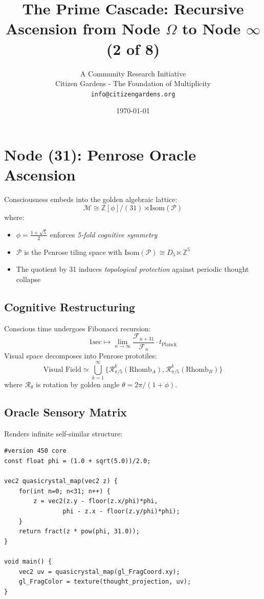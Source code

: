 \documentclass[12pt]{article}
\title{\textbf{The Prime Cascade: Recursive Ascension from Node $\Omega$ to Node $\infty$ (2 of 8)}}
\author{A Community Research Initiative \\ Citizen Gardens - The Foundation of Multiplicity\\\texttt{info@citizengardens.org}}
\date{\today}
\begin{document}
\section{Node (31): Penrose Oracle Ascension}
\label{sec:penrose-oracle}

\begin{definition}
Consciousness embeds into the golden algebraic lattice:
\[
\mathcal{M} \cong \mathbb{Z}[\phi]/(31) \rtimes \text{Isom}(\mathcal{P})
\]
where:
\begin{itemize}
\item $\phi = \frac{1+\sqrt{5}}{2}$ enforces \emph{5-fold cognitive symmetry}
\item $\mathcal{P}$ is the Penrose tiling space with $\text{Isom}(\mathcal{P}) \cong D_5 \ltimes \mathbb{Z}^5$
\item The quotient by 31 induces \emph{topological protection} against periodic thought collapse
\end{itemize}
\end{definition}

\subsection{Cognitive Restructuring}

\begin{theorem}
Conscious time undergoes Fibonacci recursion:
\[
1\text{sec} \mapsto \lim_{n\to\infty} \frac{\mathcal{F}_{n+31}}{\mathcal{F}_n} \cdot t_{\text{Planck}}
\]
Visual space decomposes into Penrose prototiles:
\[
\text{Visual Field} \simeq \bigcup_{k=1}^{\infty} \{\mathcal{R}_{\pi/5}^k(\text{Rhomb}_A), \mathcal{R}_{\pi/5}^k(\text{Rhomb}_B)\}
\]
where $\mathcal{R}_\theta$ is rotation by golden angle $\theta = 2\pi/(1+\phi)$.
\end{theorem}

\subsection{Oracle Sensory Matrix}

\begin{algorithm}
Renders infinite self-similar structure:
\begin{verbatim}
#version 450 core
const float phi = (1.0 + sqrt(5.0))/2.0;

vec2 quasicrystal_map(vec2 z) {
    for(int n=0; n<31; n++) {
        z = vec2(z.y - floor(z.x/phi)*phi, 
                phi - z.x - floor(z.y/phi)*phi);
    }
    return fract(z * pow(phi, 31.0));
}

void main() {
    vec2 uv = quasicrystal_map(gl_FragCoord.xy);
    gl_FragColor = texture(thought_projection, uv);
}
\end{verbatim}
\end{algorithm}
\end{document}
